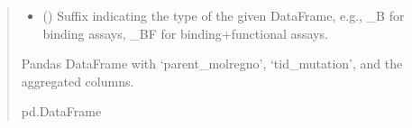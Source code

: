 \documentclass[letterpaper,10pt,english]{sphinxmanual}
\begin{document}
\begin{fulllineitems}
\begin{quote}
\begin{description}
\begin{itemize}
\item {} 
\sphinxAtStartPar
{} () \textendash{} Suffix indicating the type of the given DataFrame, e.g., \_B for binding assays, \_BF for binding+functional assays.

\end{itemize}

\sphinxAtStartPar
Pandas DataFrame with ‘parent\_molregno’, ‘tid\_mutation’, and the aggregated columns.

\sphinxAtStartPar
pd.DataFrame

\end{description}\end{quote}

\end{fulllineitems}

\end{document}
